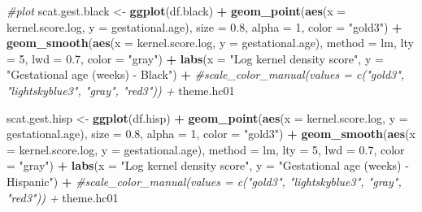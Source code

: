 \documentclass[
  12pt,
]{article}
\newenvironment{Shaded}{\begin{snugshade}}{\end{snugshade}}
\newcommand{\CommentTok}[1]{\textcolor[rgb]{0.56,0.35,0.01}{\textit{#1}}}
\newcommand{\DataTypeTok}[1]{\textcolor[rgb]{0.13,0.29,0.53}{#1}}
\newcommand{\DecValTok}[1]{\textcolor[rgb]{0.00,0.00,0.81}{#1}}
\newcommand{\FloatTok}[1]{\textcolor[rgb]{0.00,0.00,0.81}{#1}}
\newcommand{\KeywordTok}[1]{\textcolor[rgb]{0.13,0.29,0.53}{\textbf{#1}}}
\newcommand{\NormalTok}[1]{#1}
\newcommand{\OperatorTok}[1]{\textcolor[rgb]{0.81,0.36,0.00}{\textbf{#1}}}
\newcommand{\StringTok}[1]{\textcolor[rgb]{0.31,0.60,0.02}{#1}}
\begin{document}
\begin{Shaded}
\begin{Highlighting}[]
\CommentTok{#plot}
\NormalTok{scat.gest.black <-}\StringTok{ }\KeywordTok{ggplot}\NormalTok{(df.black) }\OperatorTok{+}
\StringTok{  }\KeywordTok{geom_point}\NormalTok{(}\KeywordTok{aes}\NormalTok{(}\DataTypeTok{x =}\NormalTok{ kernel.score.log, }\DataTypeTok{y =}\NormalTok{ gestational.age), }
             \DataTypeTok{size =} \FloatTok{0.8}\NormalTok{, }\DataTypeTok{alpha =} \DecValTok{1}\NormalTok{, }\DataTypeTok{color =} \StringTok{"gold3"}\NormalTok{) }\OperatorTok{+}\StringTok{ }
\StringTok{  }\KeywordTok{geom_smooth}\NormalTok{(}\KeywordTok{aes}\NormalTok{(}\DataTypeTok{x =}\NormalTok{ kernel.score.log, }\DataTypeTok{y =}\NormalTok{ gestational.age), }
              \DataTypeTok{method =}\NormalTok{ lm, }
              \DataTypeTok{lty =} \DecValTok{5}\NormalTok{, }\DataTypeTok{lwd =} \FloatTok{0.7}\NormalTok{, }\DataTypeTok{color =} \StringTok{"gray"}\NormalTok{) }\OperatorTok{+}
\StringTok{  }\KeywordTok{labs}\NormalTok{(}\DataTypeTok{x =} \StringTok{"Log kernel density score"}\NormalTok{, }
       \DataTypeTok{y =} \StringTok{"Gestational age (weeks) - Black"}\NormalTok{) }\OperatorTok{+}
\StringTok{  }\CommentTok{#scale_color_manual(values = c("gold3", "lightskyblue3", "gray", "red3")) + }
\StringTok{  }\NormalTok{theme.hc01}

\NormalTok{scat.gest.hisp <-}\StringTok{ }\KeywordTok{ggplot}\NormalTok{(df.hisp) }\OperatorTok{+}
\StringTok{  }\KeywordTok{geom_point}\NormalTok{(}\KeywordTok{aes}\NormalTok{(}\DataTypeTok{x =}\NormalTok{ kernel.score.log, }\DataTypeTok{y =}\NormalTok{ gestational.age), }
             \DataTypeTok{size =} \FloatTok{0.8}\NormalTok{, }\DataTypeTok{alpha =} \DecValTok{1}\NormalTok{, }\DataTypeTok{color =} \StringTok{"gold3"}\NormalTok{) }\OperatorTok{+}\StringTok{ }
\StringTok{  }\KeywordTok{geom_smooth}\NormalTok{(}\KeywordTok{aes}\NormalTok{(}\DataTypeTok{x =}\NormalTok{ kernel.score.log, }\DataTypeTok{y =}\NormalTok{ gestational.age), }
              \DataTypeTok{method =}\NormalTok{ lm, }
              \DataTypeTok{lty =} \DecValTok{5}\NormalTok{, }\DataTypeTok{lwd =} \FloatTok{0.7}\NormalTok{, }\DataTypeTok{color =} \StringTok{"gray"}\NormalTok{) }\OperatorTok{+}
\StringTok{  }\KeywordTok{labs}\NormalTok{(}\DataTypeTok{x =} \StringTok{"Log kernel density score"}\NormalTok{, }
       \DataTypeTok{y =} \StringTok{"Gestational age (weeks) - Hispanic"}\NormalTok{) }\OperatorTok{+}
\StringTok{  }\CommentTok{#scale_color_manual(values = c("gold3", "lightskyblue3", "gray", "red3")) + }
\StringTok{  }\NormalTok{theme.hc01}


\end{Highlighting}
\end{Shaded}
\end{document}
